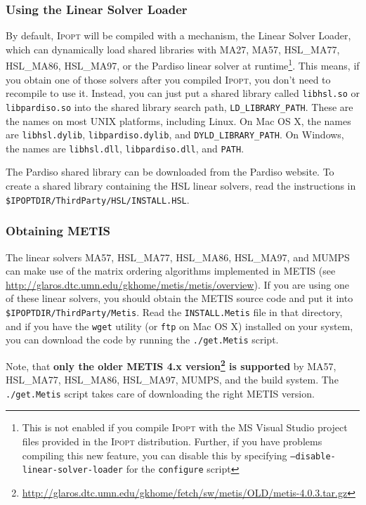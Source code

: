 \documentclass[10pt]{article}
\newcommand{\Ipopt}{\textsc{Ipopt}\xspace}
\begin{document}
\subsubsection{Using the Linear Solver Loader}\label{sec:linear_solver_loader}
By default, \Ipopt will be compiled with a mechanism, the Linear
Solver Loader, which can dynamically load shared libraries with MA27,
MA57, HSL\_MA77, HSL\_MA86, HSL\_MA97, or the Pardiso linear solver at 
runtime\footnote{This is not
  enabled if you compile \Ipopt with the MS Visual Studio project files
  provided in the \Ipopt distribution.  Further, if you have problems
  compiling this new feature, you can disable this by specifying
  \texttt{--disable-linear-solver-loader} for the \texttt{configure}
  script}. This means, if you obtain one of those solvers after you
compiled \Ipopt, you don't need to recompile to
use it.  Instead, you can just put a shared library called
\texttt{libhsl.so} or \texttt{libpardiso.so} into the shared library
search path, \texttt{LD\_LIBRARY\_PATH}.  These are the names on most
UNIX platforms, including Linux.  On Mac OS X, the names are
\texttt{libhsl.dylib}, \texttt{libpardiso.dylib}, and
\texttt{DYLD\_LIBRARY\_PATH}.  On Windows, the names are \texttt{libhsl.dll},
\texttt{libpardiso.dll}, and \texttt{PATH}.

The Pardiso shared library can be downloaded from the Pardiso website.
To create a shared library containing the HSL linear solvers, read the
instructions in \texttt{\$IPOPTDIR/ThirdParty/HSL/INSTALL.HSL}.

\subsubsection{Obtaining METIS}\label{sec:METIS}

The linear solvers MA57, HSL\_MA77, HSL\_MA86, HSL\_MA97, and MUMPS can make 
use of the matrix ordering algorithms implemented in METIS (see
\url{http://glaros.dtc.umn.edu/gkhome/metis/metis/overview}).  If
you are using one of these linear solvers, you should obtain the METIS
source code and put it into \texttt{\$IPOPTDIR/ThirdParty/Metis}.
Read the \texttt{INSTALL.Metis} file in that directory, and if you
have the \texttt{wget} utility (or \texttt{ftp} on Mac OS X) installed on your 
system, you can download the code by running the \texttt{./get.Metis} script.

Note, that {\bf only the older METIS 4.x version\footnote{\url{http://glaros.dtc.umn.edu/gkhome/fetch/sw/metis/OLD/metis-4.0.3.tar.gz}} is supported} by
MA57, HSL\_MA77, HSL\_MA86, HSL\_MA97, MUMPS, and the build system.
The \texttt{./get.Metis} script takes care of downloading the right METIS version.
\end{document}
